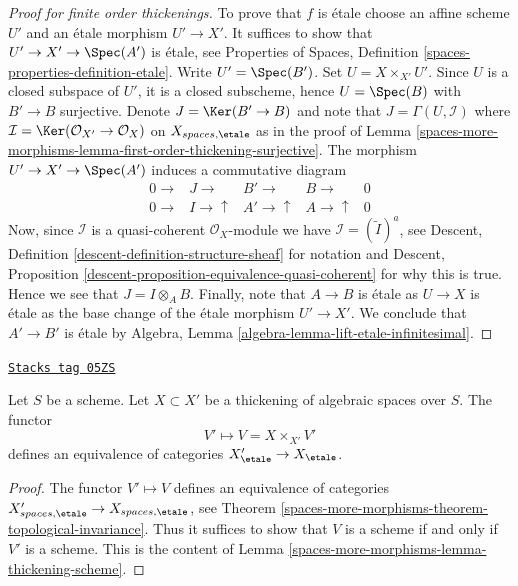\begin{proof}[Proof for finite order thickenings]
\medskip\noindent
To prove that $f$ is \'etale choose an affine scheme $U'$ and an
\'etale morphism $U' \to X'$. It suffices to show that
$U' \to X' \to \Spec(A')$ is \'etale, see
Properties of Spaces, Definition \ref{spaces-properties-definition-etale}.
Write $U' = \Spec(B')$. Set $U = X \times_{X'} U'$. Since $U$
is a closed subspace of $U'$, it is a closed subscheme, hence
$U = \Spec(B)$ with $B' \to B$ surjective. Denote
$J = \Ker(B' \to B)$ and note that $J = \Gamma(U, \mathcal{I})$
where $\mathcal{I} = \Ker(\mathcal{O}_{X'} \to \mathcal{O}_X)$
on $X_{spaces, \etale}$ as in the proof of
Lemma \ref{spaces-more-morphisms-lemma-first-order-thickening-surjective}.
The morphism $U' \to X' \to \Spec(A')$ induces a commutative
diagram
$$
\begin{array}{ccccc}0 \longrightarrow & J \longrightarrow & B' \longrightarrow & B \longrightarrow & 0 \\ 0 \longrightarrow & I \longrightarrow\uparrow & A' \longrightarrow\uparrow & A \longrightarrow\uparrow & 0\end{array}
$$
Now, since $\mathcal{I}$ is a quasi-coherent $\mathcal{O}_X$-module
we have $\mathcal{I} = (\widetilde I)^a$, see
Descent, Definition \ref{descent-definition-structure-sheaf}
for notation and
Descent, Proposition \ref{descent-proposition-equivalence-quasi-coherent}
for why this is true. Hence we see that $J = I \otimes_A B$.
Finally, note that $A \to B$ is \'etale as $U \to X$ is \'etale as
the base change of the \'etale morphism $U' \to X'$.
We conclude that $A' \to B'$ is \'etale by
Algebra, Lemma \ref{algebra-lemma-lift-etale-infinitesimal}.
\end{proof}

\begin{lemma}
\label{spaces-more-morphisms-lemma-thickening-equivalence}
\href{https://stacks.math.columbia.edu/tag/05ZS}{\texttt{Stacks tag 05ZS}}

Let $S$ be a scheme. Let $X \subset X'$ be a thickening of algebraic spaces
over $S$. The functor
$$
V' \longmapsto V = X \times_{X'} V'
$$
defines an equivalence of categories
$X'_\etale \to X_\etale$.
\end{lemma}

\begin{proof}
The functor $V' \mapsto V$ defines an equivalence of categories
$X'_{spaces, \etale} \to X_{spaces, \etale}$, see
Theorem \ref{spaces-more-morphisms-theorem-topological-invariance}.
Thus it suffices to show that $V$ is a scheme if and only if $V'$ is
a scheme. This is the content of
Lemma \ref{spaces-more-morphisms-lemma-thickening-scheme}.
\end{proof}

